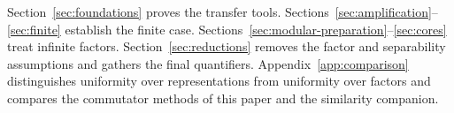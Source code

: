 Section~\ref{sec:foundations} proves the transfer tools.
Sections~\ref{sec:amplification}--\ref{sec:finite} establish the finite
case. Sections~\ref{sec:modular-preparation}--\ref{sec:cores} treat
infinite factors. Section~\ref{sec:reductions} removes the factor and
separability assumptions and gathers the final quantifiers.
Appendix~\ref{app:comparison} distinguishes uniformity over
representations from uniformity over factors and compares the
commutator methods of this paper and the similarity companion.
